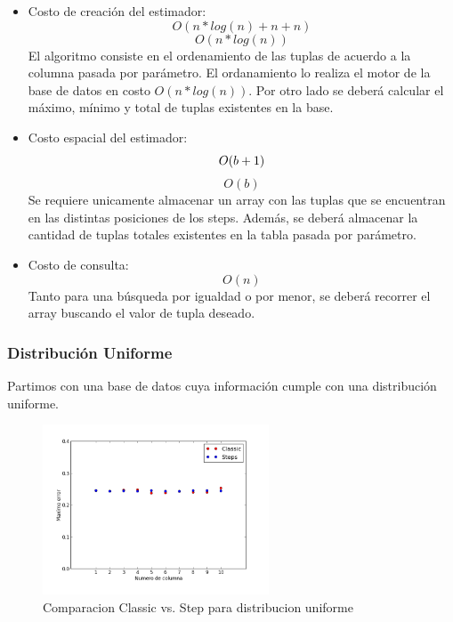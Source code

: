 \documentclass[10pt, a4paper,english,spanish,hidelinks]{article}
\begin{document}
\begin{itemize}

\item Costo de creación del estimador:
\begin{equation}
O(n*log(n) + n + n)
\end{equation}
\begin{equation}
O(n*log(n))
\end{equation}
El algoritmo consiste en el ordenamiento de las tuplas de acuerdo a la columna pasada por parámetro. El ordanamiento lo realiza el motor de la base de datos en costo $O(n*log(n))$. Por otro lado se deberá calcular el máximo, mínimo y total de tuplas existentes en la base.

\item Costo espacial del estimador:
\begin{equation}
O(b + 1) \\
\end{equation}
\begin{equation}
O(b)
\end{equation}
Se requiere unicamente almacenar un array con las tuplas que se encuentran en las distintas posiciones de los steps. Además, se deberá almacenar la cantidad de tuplas totales existentes en la tabla pasada por parámetro.

\item Costo de consulta:
\begin{equation}
O(n)
\end{equation}
Tanto para una búsqueda por igualdad o por menor, se deberá recorrer el array buscando el valor de tupla deseado.

\end{itemize}

\subsubsection{Distribución Uniforme}

Partimos con una base de datos cuya información cumple con una distribución uniforme.

\begin{figure}[h!]
  \centering
  \includegraphics[width=0.6\textwidth]{./imagenes/ejb1_uniforme.png}
  \caption{Comparacion Classic vs. Step para distribucion uniforme}
\end{figure}
\end{document}
